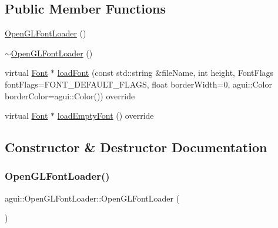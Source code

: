 \subsection*{Public Member Functions}
\begin{DoxyCompactItemize}
\item 
\mbox{\hyperlink{classagui_1_1_open_g_l_font_loader_a82158e551d0a68d104b1601311ff5669}{Open\+G\+L\+Font\+Loader}} ()
\item 
\mbox{\hyperlink{classagui_1_1_open_g_l_font_loader_ad187229f4cc62cd91ee90e6431e0cd2e}{$\sim$\+Open\+G\+L\+Font\+Loader}} ()
\item 
virtual \mbox{\hyperlink{class_font}{Font}} $\ast$ \mbox{\hyperlink{classagui_1_1_open_g_l_font_loader_a6f90ac8ad2a2d11c6423d5c9559e3f65}{load\+Font}} (const std\+::string \&file\+Name, int height, Font\+Flags font\+Flags=F\+O\+N\+T\+\_\+\+D\+E\+F\+A\+U\+L\+T\+\_\+\+F\+L\+A\+GS, float border\+Width=0, agui\+::\+Color border\+Color=agui\+::\+Color()) override
\item 
virtual \mbox{\hyperlink{class_font}{Font}} $\ast$ \mbox{\hyperlink{classagui_1_1_open_g_l_font_loader_af11760c16e9f88ee6c534a914897096e}{load\+Empty\+Font}} () override
\end{DoxyCompactItemize}


\subsection{Constructor \& Destructor Documentation}
\mbox{\label{classagui_1_1_open_g_l_font_loader_a82158e551d0a68d104b1601311ff5669}} 
\subsubsection{\texorpdfstring{Open\+G\+L\+Font\+Loader()}{OpenGLFontLoader()}}
{\footnotesize\ttfamily agui\+::\+Open\+G\+L\+Font\+Loader\+::\+Open\+G\+L\+Font\+Loader (\begin{DoxyParamCaption}{ }\end{DoxyParamCaption})\hspace{0.3cm}{\ttfamily [explicit]}}

\mbox{\label{classagui_1_1_open_g_l_font_loader_ad187229f4cc62cd91ee90e6431e0cd2e}} 
